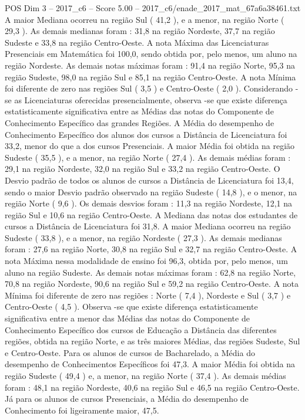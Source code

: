 \begin{textsample}{POS Dim 3 – 2017\_c6 – Score 5.00 – 2017\_c6/enade\_2017\_mat\_67a6a38461.txt}
A maior Mediana ocorreu na região Sul ( 41,2 ), e a menor, na região Norte ( 29,3 ).
As demais medianas foram : 31,8 na região Nordeste, 37,7 na região Sudeste e 33,8 na região Centro-Oeste.
A nota Máxima das Licenciaturas Presenciais em Matemática foi 100,0, sendo obtida por, pelo menos, um aluno na região Nordeste.
As demais notas máximas foram : 91,4 na região Norte, 95,3 na região Sudeste, 98,0 na região Sul e 85,1 na região Centro-Oeste.
A nota Mínima foi diferente de zero nas regiões Sul ( 3,5 ) e Centro-Oeste ( 2,0 ).
Considerando -se as Licenciaturas oferecidas presencialmente, observa -se que existe diferença estatisticamente significativa entre as Médias das notas do Componente de Conhecimento Específico das grandes Regiões.
A Média do desempenho de Conhecimento Específico dos alunos dos cursos a Distância de Licenciatura foi 33,2, menor do que a dos cursos Presenciais.
A maior Média foi obtida na região Sudeste ( 35,5 ), e a menor, na região Norte ( 27,4 ).
As demais médias foram : 29,1 na região Nordeste, 32,0 na região Sul e 33,2 na região Centro-Oeste.
O Desvio padrão de todos os alunos de cursos a Distância de Licenciatura foi 13,4, sendo o maior Desvio padrão observado na região Sudeste ( 14,8 ), e o menor, na região Norte ( 9,6 ).
Os demais desvios foram : 11,3 na região Nordeste, 12,1 na região Sul e 10,6 na região Centro-Oeste.
A Mediana das notas dos estudantes de cursos a Distância de Licenciatura foi 31,8.
A maior Mediana ocorreu na região Sudeste ( 33,8 ), e a menor, na região Nordeste ( 27,3 ).
As demais medianas foram : 27,6 na região Norte, 30,8 na região Sul e 32,7 na região Centro-Oeste.
A nota Máxima nessa modalidade de ensino foi 96,3, obtida por, pelo menos, um aluno na região Sudeste.
As demais notas máximas foram : 62,8 na região Norte, 70,8 na região Nordeste, 90,6 na região Sul e 59,2 na região Centro-Oeste.
A nota Mínima foi diferente de zero nas regiões : Norte ( 7,4 ), Nordeste e Sul ( 3,7 ) e Centro-Oeste ( 4,5 ).
Observa -se que existe diferença estatisticamente significativa entre a menor das Médias das notas do Componente de Conhecimento Específico dos cursos de Educação a Distância das diferentes regiões, obtida na região Norte, e as três maiores Médias, das regiões Sudeste, Sul e Centro-Oeste.
Para os alunos de cursos de Bacharelado, a Média do desempenho de Conhecimentos Específicos foi 47,3.
A maior Média foi obtida na região Sudeste ( 49,4 ) e, a menor, na região Norte ( 37,4 ).
As demais médias foram : 48,1 na região Nordeste, 40,6 na região Sul e 46,5 na região Centro-Oeste.
Já para os alunos de cursos Presenciais, a Média do desempenho de Conhecimento foi ligeiramente maior, 47,5.

\end{textsample}
